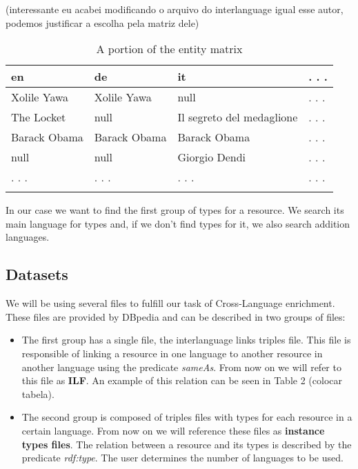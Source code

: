 \documentclass[10pt,a4paper]{llncs}
\begin{document}
(interessante eu acabei modificando o arquivo do interlanguage igual esse autor, podemos justificar a escolha pela matriz dele)

\begin{table}
\centering
    \begin{tabular}{llll}
    en           & de           & it                        & . . .  \\ \hline
    Xolile Yawa  & Xolile Yawa  & null                      &  . . . \\
    The Locket   & null         & Il segreto del medaglione & . . .  \\
    Barack Obama & Barack Obama & Barack Obama              & . . .  \\
    null         & null         & Giorgio Dendi             & . . .  \\
    . . .        & . . .        & . . .                     & . . .  \\
    \vspace{0.2cm}
    \end{tabular}
    \caption{A portion of the entity matrix}
	  \label{tab:entityMatrix}
\end{table}

In our case we want to find the first group of types for a resource. We search its main language for types and, if we don't find types for it, we also search addition languages.

\subsection{Datasets}

We will be using several files to fulfill our task of Cross-Language enrichment. These files are provided by DBpedia and can be described in two groups of files:

\begin{itemize}
	\item The first group has a single file, the interlanguage links triples file. This file is responsible of linking a resource in one language to another resource in another language using the predicate \textit{sameAs}. From now on we will refer to this file as \textbf{ILF}. An example of this relation can be seen in Table 2 (colocar tabela).
	\item The second group is composed of triples files with types for each resource in a certain language. From now on we will reference these files as \textbf{instance types files}. The relation between a resource and its types is described by the predicate \textit{rdf:type}. The user determines the number of languages to be used.
\end{itemize}
\end{document}
